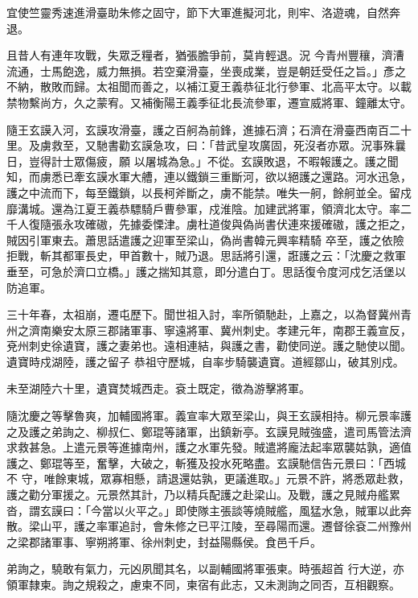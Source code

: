 \begin{pinyinscope}
 宜使竺靈秀速進滑臺助朱修之固守，節下大軍進擬河北，則牢、洛遊魂，自然奔退。



 且昔人有連年攻戰，失眾乏糧者，猶張膽爭前，莫肯輕退。況
 今青州豐穰，濟漕流通，士馬飽逸，威力無損。若空棄滑臺，坐喪成業，豈是朝廷受任之旨。」彥之不納，散敗而歸。太祖聞而善之，以補江夏王義恭征北行參軍、北高平太守。以載禁物繫尚方，久之蒙宥。又補衡陽王義季征北長流參軍，遷宣威將軍、鐘離太守。



 隨王玄謨入河，玄謨攻滑臺，護之百舸為前鋒，進據石濟；石濟在滑臺西南百二十里。及虜救至，又馳書勸玄謨急攻，曰：「昔武皇攻廣固，死沒者亦眾。況事殊曩日，豈得計士眾傷疲，願
 以屠城為急。」不從。玄謨敗退，不暇報護之。護之聞知，而虜悉已牽玄謨水軍大艚，連以鐵鎖三重斷河，欲以絕護之還路。河水迅急，護之中流而下，每至鐵鎖，以長柯斧斷之，虜不能禁。唯失一舸，餘舸並全。留戍靡溝城。還為江夏王義恭驃騎戶曹參軍，戍淮陰。加建武將軍，領濟北太守。率二千人復隨張永攻確磝，先據委慄津。虜杜道俊與偽尚書伏連來援確磝，護之拒之，賊因引軍東去。蕭思話遣護之迎軍至梁山，偽尚書韓元興率精騎
 卒至，護之依險拒戰，斬其都軍長史，甲首數十，賊乃退。思話將引還，誑護之云：「沈慶之救軍垂至，可急於濟口立橋。」護之揣知其意，即分遣白丁。思話復令度河戍乞活堡以防追軍。



 三十年春，太祖崩，遷屯歷下。聞世祖入討，率所領馳赴，上嘉之，以為督冀州青州之濟南樂安太原三郡諸軍事、寧遠將軍、冀州刺史。孝建元年，南郡王義宣反，兗州刺史徐遺寶，護之妻弟也。遠相連結，與護之書，勸使同逆。護之馳使以聞。遺寶時戍湖陸，護之留子
 恭祖守歷城，自率步騎襲遺寶。道經鄒山，破其別戍。



 未至湖陸六十里，遺寶焚城西走。袞土既定，徵為游擊將軍。



 隨沈慶之等擊魯爽，加輔國將軍。義宣率大眾至梁山，與王玄謨相持。柳元景率護之及護之弟詢之、柳叔仁、鄭琨等諸軍，出鎮新亭。玄謨見賊強盛，遣司馬管法濟求救甚急。上遣元景等進據南州，護之水軍先發。賊遣將龐法起率眾襲姑孰，適值護之、鄭琨等至，奮擊，大破之，斬獲及投水死略盡。玄謨馳信告元景曰：「西城不
 守，唯餘東城，眾寡相懸，請退還姑孰，更議進取。」元景不許，將悉眾赴救，護之勸分軍援之。元景然其計，乃以精兵配護之赴梁山。及戰，護之見賊舟艦累沓，謂玄謨曰：「今當以火平之。」即使隊主張談等燒賊艦，風猛水急，賊軍以此奔散。梁山平，護之率軍追討，會朱修之已平江陵，至尋陽而還。遷督徐袞二州豫州之梁郡諸軍事、寧朔將軍、徐州刺史，封益陽縣侯。食邑千戶。



 弟詢之，驍敢有氣力，元凶夙聞其名，以副輔國將軍張柬。時張超首
 行大逆，亦領軍隸柬。詢之規殺之，慮柬不同，柬宿有此志，又未測詢之同否，互相觀察。




\end{pinyinscope}

